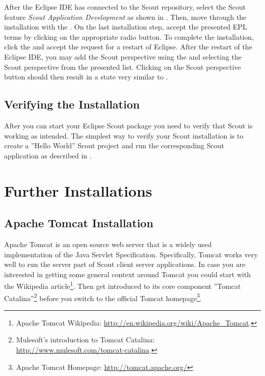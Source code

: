 \documentclass[a4paper,10pt,twoside]{book}
\begin{document}
After the Eclipse IDE has connected to the Scout repository, select the Scout feature \textit{Scout Application Development} as shown in .
Then, move through the installation with the .
On the last installation step, accept the presented EPL terms by clicking on the appropriate radio button. 
To complete the installation, click the  and accept the request for a restart of Eclipse.
After the restart of the Eclipse IDE, you may add the Scout perspective using the  and selecting the Scout perspective from the presented list. 
Clicking on the Scout perspective button should then result in a state very similar to .

\section{Verifying the Installation}

After you can start your Eclipse Scout package you need to verify that Scout is working as intended.
The simplest way to verify your Scout installation is to create a ''Hello World'' Scout project and run the corresponding Scout application as described in .

\chapter{Further Installations}

\section{Apache Tomcat Installation}

Apache Tomcat is an open source web server that is a widely used implementation of the Java Servlet Specification.
Specifically, Tomcat works very well to run the server part of Scout client server applications.
In case you are interested in getting some general context around Tomcat you could start with the Wikipedia article\footnote{
Apache Tomcat Wikipedia: \url{http://en.wikipedia.org/wiki/Apache_Tomcat}.
}.
Then get introduced to its core component ''Tomcat Catalina''\footnote{
Mulesoft's introduction to Tomcat Catalina: \url{http://www.mulesoft.com/tomcat-catalina}.
}
before you switch to the official Tomcat homepage\footnote{
Apache Tomcat Homepage: \url{http://tomcat.apache.org/}
}.
\end{document}
